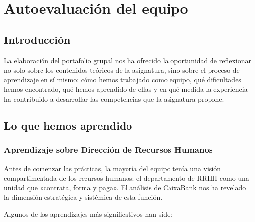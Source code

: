 %

\chapter{Autoevaluación del equipo}

\section{Introducción}

La elaboración del portafolio grupal nos ha ofrecido la oportunidad de
reflexionar no solo sobre los contenidos teóricos de la asignatura, sino
sobre el proceso de aprendizaje en sí mismo: cómo hemos trabajado como
equipo, qué dificultades hemos encontrado, qué hemos aprendido de ellas
y en qué medida la experiencia ha contribuido a desarrollar las competencias
que la asignatura propone.

\section{Lo que hemos aprendido}

\subsection{Aprendizaje sobre Dirección de Recursos Humanos}

Antes de comenzar las prácticas, la mayoría del equipo tenía una visión
compartimentada de los recursos humanos: el departamento de RRHH como
una unidad que «contrata, forma y paga». El análisis de CaixaBank nos ha
revelado la dimensión estratégica y sistémica de esta función.

Algunos de los aprendizajes más significativos han sido:

